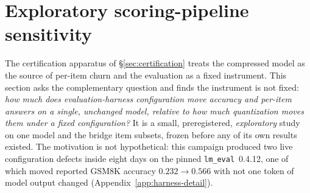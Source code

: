 %
%
%
%

\section{Exploratory scoring-pipeline sensitivity}
\label{sec:sensitivity}

The certification apparatus of \S\ref{sec:certification} treats the compressed
model as the source of per-item churn and the evaluation as a fixed instrument.
This section asks the complementary question and finds the instrument is not
fixed: \emph{how much does evaluation-harness configuration move accuracy and
per-item answers on a single, unchanged model, relative to how much quantization
moves them under a fixed configuration?}
It is a small, preregistered, \emph{exploratory} study on one model and the bridge
item subsets, frozen before any of its own results existed. The motivation is
not hypothetical: this campaign produced two live configuration defects inside
eight days on the pinned \texttt{lm\_eval}~0.4.12, one of which moved reported
GSM8K accuracy $0.232 \to 0.566$ with not one token of model output changed
(Appendix~\ref{app:harness-detail}).

